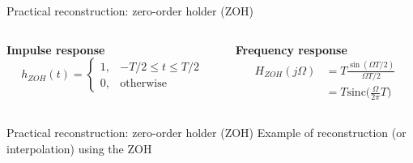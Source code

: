 \documentclass[10pt]{beamer}
\begin{document}
\begin{frame}{Practical reconstruction: zero-order holder (ZOH)}
	\begin{columns}[t]
		\begin{column}{0.5\textwidth}
			\textbf{Impulse response}
			\begin{equation*}
				h_{ZOH}(t) = \begin{cases}
				1, & -T/2 \leq t \leq T/2 \\
				0, & \text{otherwise}
				\end{cases} 
			\end{equation*}
		\end{column}
			\begin{column}{0.5\textwidth}
				\textbf{Frequency response}
				\begin{align*}
					H_{ZOH}(j\Omega) &= T\frac{\sin(\Omega T/2)}{\Omega T/2} \\
					&= T\mathrm{sinc}\Big(\frac{\Omega}{2\pi} T\Big)
				\end{align*}
		\end{column}
	\end{columns}
	\begin{center}
	\resizebox{\linewidth}{!}{}
\end{center}
\end{frame}

\begin{frame}{Practical reconstruction: zero-order holder (ZOH)}
	Example of reconstruction (or interpolation) using the ZOH
	\begin{center}
		\resizebox{0.7\linewidth}{!}{}
	\end{center}	
\end{frame}
\end{document}
